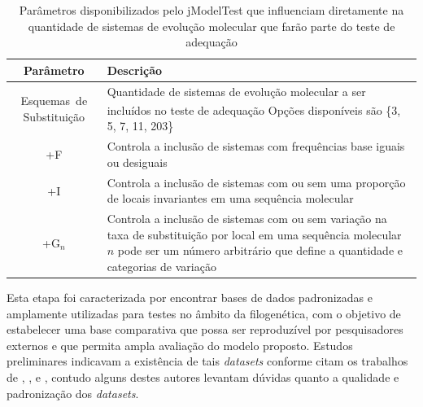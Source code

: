 \documentclass[english,brazilian]{UNISINOSmonografia} %
\newcommand\defaultFigureWidth{0.9}
\renewcommand{\arraystretch}{1.3}
\begin{document}
\begin{table}[tb]
	\centering%
	\begin{minipage}{\defaultFigureWidth\textwidth}
		\caption{Parâmetros disponibilizados pelo jModelTest que influenciam diretamente na quantidade de sistemas de evolução molecular que farão parte do teste de adequação}
		\label{tab:metodologia-etapas-jmodelparams}
		\small
		\vspace{1ex}
		\renewcommand\arraystretch{1.4}
		\setlength{\tymin}{9em}
		\begin{tabulary}{\textwidth}{CJ@{}}
			\toprule
			Parâmetro & Descrição \\ 
			\midrule
			Esquemas~de Substituição & Quantidade de sistemas de evolução molecular a ser incluídos no teste de adequação\textsuperscript{\dag} \newline 
			Opções disponíveis são \{3, 5, 7, 11, 203\} \\
			+F & Controla a inclusão de sistemas com frequências base iguais ou desiguais \\
			+I & Controla a inclusão de sistemas com ou sem uma proporção de locais invariantes em uma sequência molecular \\
			+G$_{n}$ & Controla a inclusão de sistemas com ou sem variação na taxa de substituição por local em uma sequência molecular \newline
			$n$ pode ser um número arbitrário que define a quantidade e categorias de variação \\
			\bottomrule	
		\end{tabulary}
	\end{minipage}
\end{table}


Esta etapa foi caracterizada por encontrar bases de dados padronizadas e amplamente utilizadas para testes no âmbito da filogenética, com o objetivo de estabelecer uma base comparativa que possa ser reproduzível por pesquisadores externos e que permita ampla avaliação do modelo proposto.
Estudos preliminares indicavam a existência de tais \textit{datasets} conforme citam os trabalhos de , ,  e , contudo alguns destes autores levantam dúvidas quanto a qualidade e padronização dos \textit{datasets}.
\end{document}
